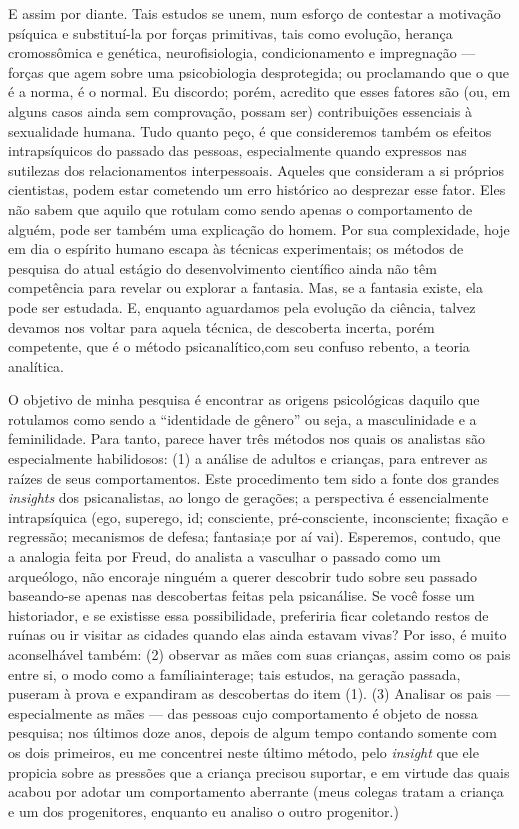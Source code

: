 E assim por diante. Tais estudos se unem, num esforço de contestar a
motivação psíquica e substituí-la por forças primitivas, tais como
evolução, herança cromossômica e genética,\idxgenet{} neurofisiologia,
condicionamento e impregnação --- forças que agem sobre uma
psicobiologia desprotegida; ou proclamando que o que é a norma, é o
normal. Eu discordo; porém, acredito que esses fatores são (ou, em
alguns casos ainda sem comprovação, possam ser) contribuições
essenciais à sexualidade humana. Tudo quanto peço, é que consideremos
também os efeitos intrapsíquicos do passado das pessoas, especialmente
quando expressos nas sutilezas dos relacionamentos interpessoais.
Aqueles que consideram a si próprios cientistas, podem estar cometendo
um erro histórico ao desprezar esse fator. Eles não sabem que aquilo
que rotulam como sendo apenas o comportamento de alguém, pode ser
também uma explicação do homem. Por sua complexidade, hoje em dia o
espírito humano escapa às técnicas experimentais; os métodos de
pesquisa do atual estágio do desenvolvimento científico ainda não têm
competência para revelar ou explorar a fantasia. Mas, se a fantasia
existe, ela pode ser estudada. E, enquanto aguardamos pela evolução da
ciência, talvez devamos nos voltar para aquela técnica, de descoberta
incerta, porém competente, que é o método psicanalítico,\idxpsica[|(] com seu
confuso rebento, a teoria analítica.

O objetivo de minha pesquisa é encontrar as origens psicológicas
daquilo que rotulamos como sendo a ``identidade de
gênero''\idxiden{} ou seja, a masculinidade e a feminilidade. Para
tanto, parece haver três métodos nos quais os analistas são
especialmente habilidosos: (1) a análise de adultos e crianças, para
entrever as raízes de seus comportamentos. Este procedimento tem sido a
fonte dos grandes \emph{insights} dos psicanalistas, ao longo de gerações; a
perspectiva é essencialmente intrapsíquica (ego, superego, id;
consciente, pré-consciente, inconsciente; fixação e regressão;
mecanismos de defesa; fantasia;\idxfanta[|)] e por aí vai). Esperemos, contudo, que
a analogia feita por Freud,\idxfreud{} do analista a vasculhar o passado como um
arqueólogo, não encoraje ninguém a querer descobrir tudo sobre seu
passado baseando-se apenas nas descobertas feitas pela psicanálise. Se
você fosse um historiador, e se existisse essa possibilidade,
preferiria ficar coletando restos de ruínas ou ir visitar as cidades
quando elas ainda estavam vivas? Por isso, é muito aconselhável também:
 (2) observar as mães\idxmaes{} com suas crianças, assim como os pais entre si, o
modo como a família\idxinflu[|(] interage; tais estudos, na geração passada, puseram
à prova e expandiram as descobertas do item (1). (3) Analisar os pais ---
especialmente as mães --- das pessoas cujo comportamento é objeto de
nossa pesquisa; nos últimos doze anos, depois de algum tempo contando
somente com os dois primeiros, eu me concentrei neste último método,
pelo \emph{insight} que ele propicia sobre as pressões que a criança precisou
suportar, e em virtude das quais acabou por adotar um comportamento
aberrante (meus colegas tratam a criança e um dos progenitores,
enquanto eu analiso o outro progenitor.)

